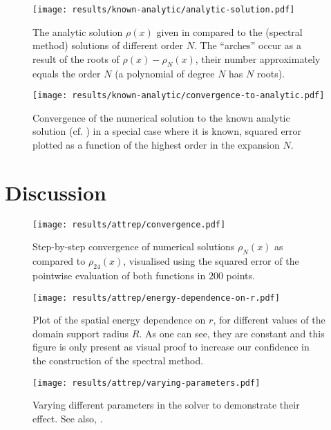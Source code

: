 \begin{figure}[H]
  \centering
  \label{fig:analytic-solution}
  \texttt{[image: results/known-analytic/analytic-solution.pdf]}
  \caption[Comparison with analytical solutions and error]{
    The analytic solution $\rho(x)$ given in  compared to the (spectral method) solutions of different order $N$.
    The ``arches'' occur as a result of the roots of $\rho(x) - \rho_N(x)$, their number approximately equals the order $N$ (a polynomial of degree $N$ has $N$ roots).
  }
\end{figure}



\begin{figure}[H]
  \centering
  \label{fig:convergence-to-analytic}
  \texttt{[image: results/known-analytic/convergence-to-analytic.pdf]}
  \caption[Convergence to analytic solution]{Convergence of the numerical solution to the known analytic solution (cf. ) in a special case where it is known, squared error plotted as a function of the highest order in the expansion $N$.}
\end{figure}

\section{Discussion}
\begin{figure}[H]
  \centering
  \label{fig:convergence}
  \texttt{[image: results/attrep/convergence.pdf]}
  \caption[Step-by-step convergence of solutions compared to order 24]{Step-by-step convergence of numerical solutions $\rho_N(x)$ as compared to $\rho_{24}(x)$, visualised using the squared error of the pointwise evaluation of both functions in $200$ points.}
\end{figure}

\begin{figure}[H]
  \centering
  \label{fig:spatial-energy-dependence}
  \texttt{[image: results/attrep/energy-dependence-on-r.pdf]}
  \caption[Spatial energy dependence on $r$]{Plot of the spatial energy dependence on $r$, for different values of the domain support radius $R$. As one can see, they are constant and this figure is only present as visual proof to increase our confidence in the construction of the spectral method.}
\end{figure}

\begin{figure}[H]
  \centering
  \label{fig:varying-parameters}
  \texttt{[image: results/attrep/varying-parameters.pdf]}
  \caption[Varying parameters in the solver]{
    Varying different parameters in the solver to demonstrate their effect.
    See also, .
  }
\end{figure}
